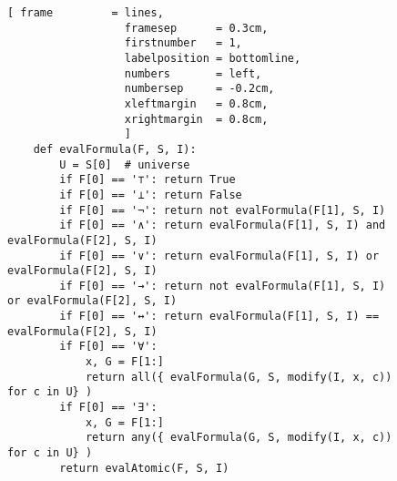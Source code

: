 \begin{figure}[!ht]
\centering
\begin{Verbatim}[ frame         = lines, 
                  framesep      = 0.3cm, 
                  firstnumber   = 1,
                  labelposition = bottomline,
                  numbers       = left,
                  numbersep     = -0.2cm,
                  xleftmargin   = 0.8cm,
                  xrightmargin  = 0.8cm,
                  ]
    def evalFormula(F, S, I):
        U = S[0]  # universe
        if F[0] == '⊤': return True
        if F[0] == '⊥': return False
        if F[0] == '¬': return not evalFormula(F[1], S, I)
        if F[0] == '∧': return evalFormula(F[1], S, I) and evalFormula(F[2], S, I)
        if F[0] == '∨': return evalFormula(F[1], S, I) or evalFormula(F[2], S, I)
        if F[0] == '→': return not evalFormula(F[1], S, I) or evalFormula(F[2], S, I)
        if F[0] == '↔': return evalFormula(F[1], S, I) == evalFormula(F[2], S, I)
        if F[0] == '∀': 
            x, G = F[1:] 
            return all({ evalFormula(G, S, modify(I, x, c)) for c in U} )
        if F[0] == '∃':
            x, G = F[1:] 
            return any({ evalFormula(G, S, modify(I, x, c)) for c in U} )
        return evalAtomic(F, S, I)                   
\end{Verbatim}
\vspace*{-0.3cm}
\caption{}
\label{fig:evalFormula.ipynb}
\end{figure}

